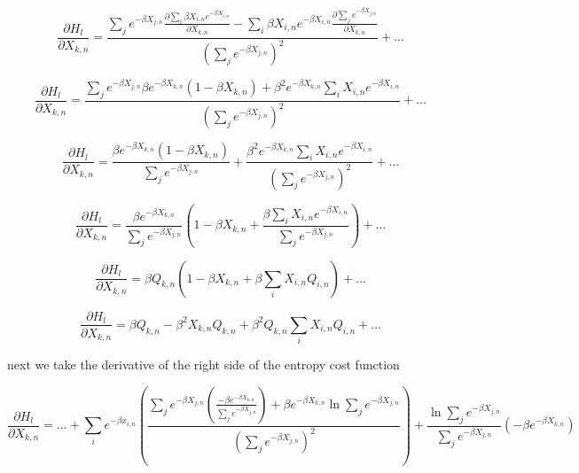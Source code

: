 \documentclass[smallextended]{svjour3}       %
\begin{document}
\begin{displaymath}
    \frac{\partial H_{l}}{\partial X_{k,n}} =
    \frac{\sum_{j}e^{-\beta X_{j,n}}\frac{\partial\sum_{i}\beta X_{i,n} e^{-\beta X_{i,n}}}{\partial X_{k,n}}
    - \sum_{i}\beta X_{i,n} e^{-\beta X_{i,n}}\frac{\partial\sum_{j}e^{-\beta X_{j,n}}}{\partial X_{k,n}}}{\left(\sum_{j}e^{-\beta X_{j,n}}\right)^{2}}
    + \ldots
\end{displaymath}

\begin{displaymath}
    \frac{\partial H_{l}}{\partial X_{k,n}} =
    \frac{\sum_{j}e^{-\beta X_{j,n}} \beta e^{-\beta X_{k,n}}\left(1 - \beta X_{k,n}\right) + \beta^{2} e^{-\beta X_{k,n}} \sum_{i}X_{i,n}e^{-\beta X_{i,n}}}{\left(\sum_{j}e^{-\beta X_{j,n}}\right)^{2}}
    + \ldots
\end{displaymath}

\begin{displaymath}
    \frac{\partial H_{l}}{\partial X_{k,n}} =
    \frac{\beta e^{-\beta X_{k,n}}\left(1 - \beta X_{k,n}\right)}{\sum_{j}e^{-\beta X_{j,n}}}
    + \frac{\beta^{2} e^{-\beta X_{k,n}} \sum_{i}X_{i,n}e^{-\beta X_{i,n}}}{\left(\sum_{j}e^{-\beta X_{j,n}}\right)^{2}}
    + \ldots
\end{displaymath}

\begin{displaymath}
    \frac{\partial H_{l}}{\partial X_{k,n}} =
    \frac{\beta e^{-\beta X_{k,n}}}{\sum_{j}e^{-\beta X_{j,n}}} \left(1 - \beta X_{k,n} + \frac{\beta \sum_{i}X_{i,n}e^{-\beta X_{i,n}}}{\sum_{j}e^{-\beta X_{j,n}}}\right)
    + \ldots
\end{displaymath}

\begin{displaymath}
    \frac{\partial H_{l}}{\partial X_{k,n}} = \beta Q_{k,n} \left(1 - \beta X_{k,n} + \beta \sum_{i}X_{i,n}Q_{i,n}\right) + \ldots
\end{displaymath}

\begin{displaymath}
    \frac{\partial H_{l}}{\partial X_{k,n}} = \beta Q_{k,n} - \beta^{2}X_{k,n}Q_{k,n} + \beta^{2}Q_{k,n}\sum_{i}X_{i,n}Q_{i,n} + \ldots
\end{displaymath}

\noindent next we take the derivative of the right side of the entropy cost function

\begin{displaymath}
    \frac{\partial H_{l}}{\partial X_{k,n}} = \ldots + 
    \sum_{i}e^{-\beta x_{i,n}} \left(\frac{\sum_{j}e^{-\beta X_{j,n}} \left(\frac{-\beta e^{-\beta X_{k,n}}}{\sum_{j}e^{-\beta X_{j,n}}}\right)
    + \beta e^{-\beta X_{k,n}}\ln{\sum_{j}e^{-\beta X_{j,n}}}}{\left(\sum_{j}e^{-\beta X_{j,n}}\right)^{2}}\right)
    + \frac{\ln{\sum_{j}e^{-\beta X_{j,n}}}}{\sum_{j}e^{-\beta X_{j,n}}}\left(-\beta e^{-\beta X_{k,n}}\right)
\end{displaymath}
\end{document}
